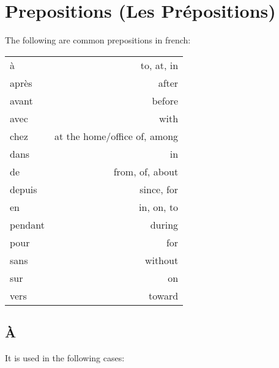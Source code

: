 \section{Prepositions (Les Pr\'epositions)}


The following are common prepositions in french:

\vspace{0.3in}

\begin{tabular}{l  r}
\`a       & to, at, in  \\
apr\`es   & after       \\
avant     & before      \\
avec      & with        \\
chez      & at the home/office of, among \\
dans      & in          \\
de        & from, of, about \\
depuis    & since, for  \\
en        & in, on, to \\
pendant   & during \\
pour      & for \\
sans      & without \\
sur       & on  \\
vers      & toward \\
\end{tabular}

\subsection{\`A}

It is used in the following cases:

